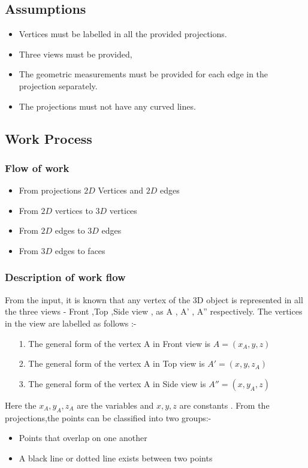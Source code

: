 \documentclass{article}
\begin{document}
\subsection{Assumptions}
\begin{itemize}
\item Vertices must be labelled in all the provided projections.
\item Three views must be provided,
\item The geometric measurements must be provided for each edge in the projection separately.
\item The projections must not have any curved lines.
\end{itemize}

\subsection{Work Process}
\subsubsection{Flow of work}
\begin{itemize}
\item From projections $2D$ Vertices and $2D$ edges 
\item From $2D$ vertices to $3D$ vertices
\item From $2D$ edges to $3D$ edges
\item From $3D$ edges to faces
\end{itemize}
\subsubsection{Description of work flow}
\hspace{15mm} From the input, it is known that any vertex of the 3D object is represented in all the three views  - Front ,Top ,Side view , as A , A' , A'' respectively. The vertices in the view are labelled as follows :-
\begin{itemize}
\item[1.] The general form of the vertex A in Front view is $A =(x_{A},y,z)$
\item[2.] The general form of the vertex A in Top view is $A' =(x,y,z_{A})$
\item[3.] The general form of the vertex A in Side view is $A'' =(x,y_{A},z)$
\end{itemize}
\hspace{15mm} Here the $x_{A} , y_{A} , z_{A}$ are the variables and $x,y,z$ are constants .
From the projections,the points can be classified into two groups:-
\begin{itemize}
\item Points that overlap on one another
\item A black line or dotted line exists between two points
\end{itemize}
\end{document}
